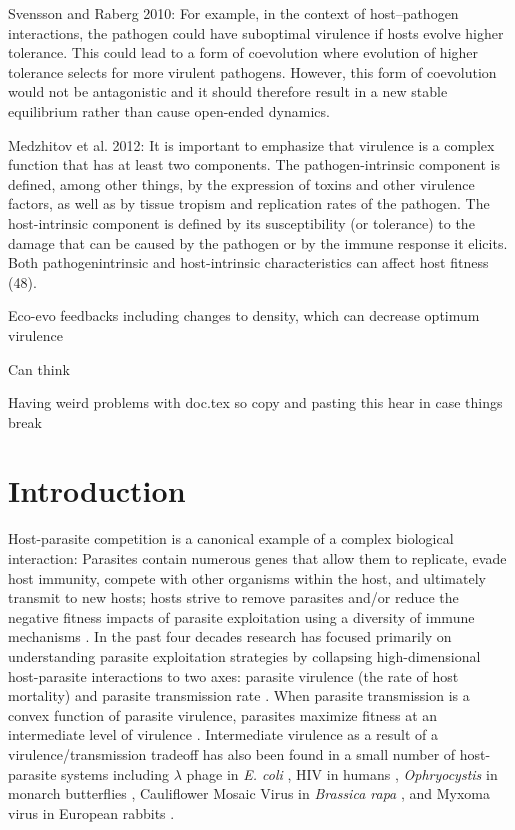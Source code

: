 Svensson and Raberg 2010: For example, in the context of host–pathogen interactions, the pathogen could have suboptimal virulence if hosts evolve higher tolerance. This could lead to a form of coevolution where evolution of higher tolerance selects for more virulent pathogens. However, this form of coevolution would not be antagonistic and it should therefore result in a new stable equilibrium rather than cause open-ended dynamics.

Medzhitov et al. 2012: It is important to emphasize that virulence is a complex function that has at least two components. The pathogen-intrinsic component is defined, among other things, by the expression of toxins and other virulence factors, as well as by tissue tropism and replication rates of the pathogen. The host-intrinsic component is defined by its susceptibility (or tolerance) to the damage that can be caused by the pathogen or by the immune response it elicits. Both pathogenintrinsic and host-intrinsic characteristics can affect host fitness (48).

Eco-evo feedbacks including changes to density, which can decrease optimum virulence 

Can think 

Having weird problems with doc.tex so copy and pasting this hear in case things break

\section*{Introduction}

Host-parasite competition is a canonical example of a complex biological interaction: Parasites contain numerous genes that allow them to replicate, evade host immunity, compete with other organisms within the host, and ultimately transmit to new hosts; hosts strive to remove parasites and/or reduce the negative fitness impacts of parasite exploitation using a diversity of immune mechanisms \citep{Soaresetal.2017}. In the past four decades research has focused primarily on understanding parasite exploitation strategies by collapsing high-dimensional host-parasite interactions to two axes: parasite virulence (the rate of host mortality) and parasite transmission rate \citep{AndersonandMay1982, Ewald1983, AlizonandMichalakis2015, Cressleretal.2016}. When parasite transmission is a convex function of parasite virulence, parasites maximize fitness at an intermediate level of virulence \citep{AndersonandMay1982, Alizonetal.2009}. Intermediate virulence as a result of a virulence/transmission tradeoff has also been found in a small number of host-parasite systems including $\lambda$ phage in \emph{E. coli} \citep{Berngruberetal.2015}, HIV in humans \citep{Fraseretal.2007}, \emph{Ophryocystis} in monarch butterflies \citep{DeRoodeetal.2008}, Cauliflower Mosaic Virus in \emph{Brassica rapa} \citep{Doumayrouetal.2013}, and Myxoma virus in European rabbits \citep{AndersonandMay1982}.

